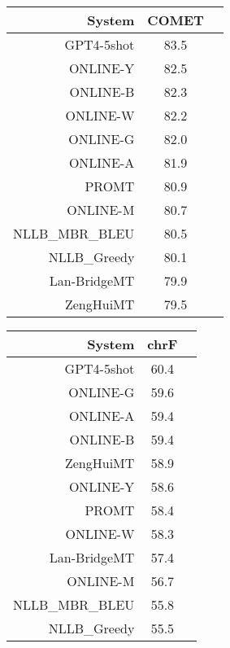 \documentclass[11pt]{article}
\begin{document}
\begin{table}  
\scriptsize
\begin{subtable}[t]{0.33\textwidth}
\begin{tabular}{rcc}
\toprule 
System  & COMET \\ 
\midrule 
\rowcolor{ashgrey} GPT4-5shot  & 83.5 \\ 
\rowcolor{ashgrey} ONLINE-Y  & 82.5 \\ 
\rowcolor{ashgrey} ONLINE-B  & 82.3 \\ 
\rowcolor{ashgrey} ONLINE-W  & 82.2 \\ 
\rowcolor{ashgrey} ONLINE-G  & 82.0 \\ 
\rowcolor{ashgrey} ONLINE-A  & 81.9 \\ 
\rowcolor{ashgrey} PROMT  & 80.9 \\ 
\rowcolor{ashgrey} ONLINE-M  & 80.7 \\ 
\rowcolor{ashgrey} NLLB\_MBR\_BLEU  & 80.5 \\ 
\rowcolor{ashgrey} NLLB\_Greedy  & 80.1 \\ 
\rowcolor{ashgrey} Lan-BridgeMT  & 79.9 \\ 
\rowcolor{ashgrey} ZengHuiMT  & 79.5 \\ 
\bottomrule 
\end{tabular} 
\end{subtable} 
\begin{subtable}[t]{0.33\textwidth}
\begin{tabular}{rcc}
\toprule 
System  & chrF \\ 
\midrule 
\rowcolor{ashgrey} GPT4-5shot  & 60.4 \\ 
\rowcolor{ashgrey} ONLINE-G  & 59.6 \\ 
\rowcolor{ashgrey} ONLINE-A  & 59.4 \\ 
\rowcolor{ashgrey} ONLINE-B  & 59.4 \\ 
\rowcolor{ashgrey} ZengHuiMT  & 58.9 \\ 
\rowcolor{ashgrey} ONLINE-Y  & 58.6 \\ 
\rowcolor{ashgrey} PROMT  & 58.4 \\ 
\rowcolor{ashgrey} ONLINE-W  & 58.3 \\ 
\rowcolor{ashgrey} Lan-BridgeMT  & 57.4 \\ 
\rowcolor{ashgrey} ONLINE-M  & 56.7 \\ 
\rowcolor{ashgrey} NLLB\_MBR\_BLEU  & 55.8 \\ 
\rowcolor{ashgrey} NLLB\_Greedy  & 55.5 \\ 

\end{tabular}
\end{subtable}
\end{table}
\end{document}
